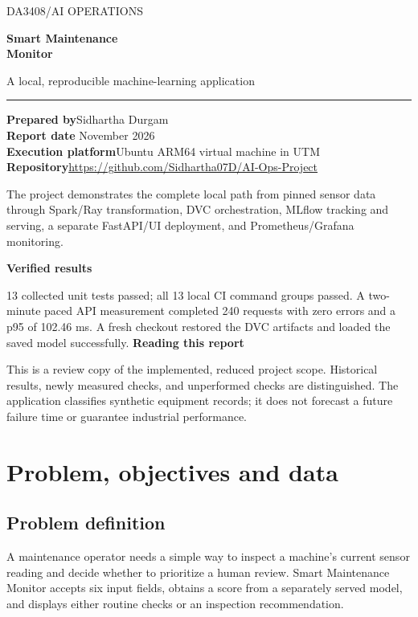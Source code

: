 \documentclass[11pt,a4paper]{article}
\newcommand{\lead}[1]{\par\vspace{4pt}\noindent\colorbox{pale}{\parbox{\dimexpr\linewidth-2\fboxsep}{\textcolor{ink}{#1}}}\par\vspace{6pt}}
\begin{document}
\hypersetup{pageanchor=false}
\begin{titlepage}
\vspace*{12mm}
{\large\color{teal} DA3408\quad /\quad AI OPERATIONS}\par
\vspace{14mm}
{\Huge\bfseries\color{ink} Smart Maintenance\\[4pt] Monitor}\par
\vspace{7mm}
{\Large A local, reproducible machine-learning application}\par
\vspace{13mm}
\rule{\linewidth}{1pt}\par
\textbf{Prepared by}\quad Sidhartha Durgam\\
\textbf{Report date} November 2026\\
\textbf{Execution platform}\quad Ubuntu ARM64 virtual machine in UTM\\
\textbf{Repository}\quad \url{https://github.com/Sidhartha07D/AI-Ops-Project}
\vspace{10mm}
\lead{The project demonstrates the complete local path from pinned sensor data through Spark/Ray transformation, DVC orchestration, MLflow tracking and serving, a separate FastAPI/UI deployment, and Prometheus/Grafana monitoring.}
\textbf{Verified results}\par
13 collected unit tests passed; all 13 local CI command groups passed. A two-minute paced API measurement completed 240 requests with zero errors and a p95 of 102.46 ms. A fresh checkout restored the DVC artifacts and loaded the saved model successfully.
\vfill
\textbf{Reading this report}\par
This is a review copy of the implemented, reduced project scope. Historical results, newly measured checks, and unperformed checks are distinguished. The application classifies synthetic equipment records; it does not forecast a future failure time or guarantee industrial performance.
\end{titlepage}
\hypersetup{pageanchor=true}
\begingroup\small\setlength{\parskip}{0pt}
\tableofcontents
\endgroup
\clearpage
{}
\section{Problem, objectives and data}
\subsection{Problem definition}
A maintenance operator needs a simple way to inspect a machine's current sensor reading and decide whether to prioritize a human review. Smart Maintenance Monitor accepts six input fields, obtains a score from a separately served model, and displays either routine checks or an inspection recommendation.
\end{document}
